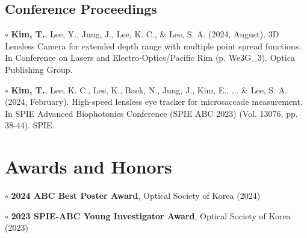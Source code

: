\documentclass[a4paper,9pt]{extarticle}
\begin{document}
\begin{spacing}{1.05}
\subsection*{Conference Proceedings}
\noindent $\circ$ \textbf{Kim, T.}, Lee, Y., Jung, J., Lee, K. C., \& Lee, S. A. (2024, August). 3D Lensless Camera for extended depth range with multiple point spread functions. In Conference on Lasers and Electro-Optics/Pacific Rim (p. We3G\_3). Optica Publishing Group.

\noindent $\circ$ \textbf{Kim, T.}, Lee, K. C., Lee, K., Baek, N., Jung, J., Kim, E., ... \& Lee, S. A. (2024, February). High-speed lensless eye tracker for microsaccade measurement. In SPIE Advanced Biophotonics Conference (SPIE ABC 2023) (Vol. 13076, pp. 38-44). SPIE. 


\section*{Awards and Honors}
\noindent $\circ$ \textbf{2024 ABC Best Poster Award}, Optical Society of Korea (2024)

\noindent $\circ$ \textbf{2023 SPIE-ABC Young Investigator Award}, Optical Society of Korea (2023)







\end{spacing}
\end{document}

